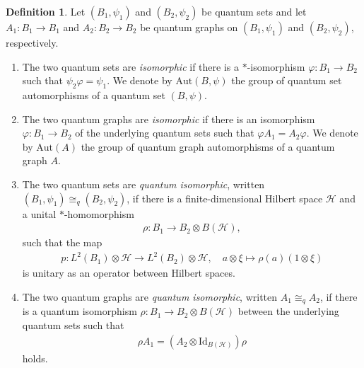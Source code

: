 \documentclass{amsart}
\theoremstyle{definition}
\newtheorem{definition}[thm]{Definition}
\theoremstyle{definition}
\begin{document}
\begin{definition}
    \label{pre::def:qisomoprhisms_of_qsets_and_qgraphs}
    Let $(B_1, \psi_1)$ and $(B_2, \psi_2)$ be quantum sets and let $A_1: B_1 \to B_1$ and $A_2: B_2 \to B_2$ be quantum graphs on $(B_1, \psi_1)$ and $(B_2, \psi_2)$, respectively.
    \begin{enumerate}
        \item The two quantum sets are \emph{isomorphic} if there is a $*$-isomorphism $\varphi: B_1 \to B_2$ such that $\psi_2 \varphi = \psi_1$. We denote by $\mathrm{Aut}(B, \psi)$ the group of quantum set automorphisms of a quantum set $(B, \psi)$.
        \item The two quantum graphs are \emph{isomorphic} if there is an isomorphism $\varphi: B_1 \to B_2$ of the underlying quantum sets such that $\varphi A_1 = A_2 \varphi$. We denote by $\mathrm{Aut}(A)$ the group of quantum graph automorphisms of a quantum graph $A$.
        \item The two quantum sets are \emph{quantum isomorphic}, written $(B_1, \psi_1) \cong_q (B_2, \psi_2)$, if there is a finite-dimensional Hilbert space $\mathcal{H}$ and a unital $\ast$-homomorphism  
        \begin{align*}
            \rho: B_1 \to B_2 \otimes B(\mathcal{H}),
        \end{align*}
        such that the map
        \begin{align*}
            p: L^2(B_1) \otimes \mathcal{H} \to L^2(B_2) \otimes \mathcal{H}, \quad a \otimes \xi \mapsto \rho(a)(1 \otimes \xi)
        \end{align*}
        is unitary as an operator between Hilbert spaces.
        \item The two quantum graphs are \emph{quantum isomorphic}, written $A_1 \cong_q A_2$, if there is a quantum isomorphism $\rho: B_1 \to B_2 \otimes B(\mathcal{H})$ between the underlying quantum sets such that
        \begin{align*}
            \rho A_1 = (A_2 \otimes \mathrm{Id}_{B(\mathcal{H})}) \rho
        \end{align*}
        holds.
    \end{enumerate}
\end{definition}
\end{document}
